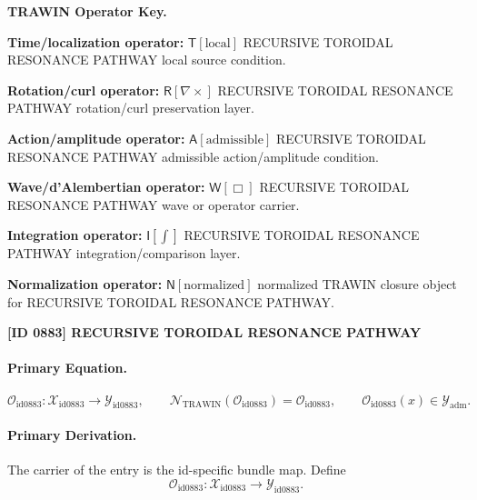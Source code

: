 \par\vspace{0.45\baselineskip}
\noindent\begin{minipage}[t]{\linewidth}
\begingroup
\small
\raggedright
\textbf{TRAWIN Operator Key.}\par
\noindent\textbf{Time/localization operator:} $\mathsf{T}\!\left[\mathrm{local}\right]$ RECURSIVE TOROIDAL RESONANCE PATHWAY local source condition.\par
\noindent\textbf{Rotation/curl operator:} $\mathsf{R}\!\left[\nabla\times\right]$ RECURSIVE TOROIDAL RESONANCE PATHWAY rotation/curl preservation layer.\par
\noindent\textbf{Action/amplitude operator:} $\mathsf{A}\!\left[\mathrm{admissible}\right]$ RECURSIVE TOROIDAL RESONANCE PATHWAY admissible action/amplitude condition.\par
\noindent\textbf{Wave/d'Alembertian operator:} $\mathsf{W}\!\left[\Box\right]$ RECURSIVE TOROIDAL RESONANCE PATHWAY wave or operator carrier.\par
\noindent\textbf{Integration operator:} $\mathsf{I}\!\left[\int\right]$ RECURSIVE TOROIDAL RESONANCE PATHWAY integration/comparison layer.\par
\noindent\textbf{Normalization operator:} $\mathsf{N}\!\left[\mathrm{normalized}\right]$ normalized TRAWIN closure object for RECURSIVE TOROIDAL RESONANCE PATHWAY.\par
\endgroup
\end{minipage}

\clearpage
\noindent\textbf{[ID 0883] RECURSIVE TOROIDAL RESONANCE PATHWAY}\par
\vspace{0.35em}
\paragraph{Primary Equation.}
\[
\mathcal{O}_{\mathrm{id0883}}:\mathcal{X}_{\mathrm{id0883}}\longrightarrow \mathcal{Y}_{\mathrm{id0883}},\qquad
\mathcal{N}_{\mathrm{TRAWIN}}(\mathcal{O}_{\mathrm{id0883}})=\mathcal{O}_{\mathrm{id0883}},\qquad
\mathcal{O}_{\mathrm{id0883}}(x)\in\mathcal{Y}_{\mathrm{adm}}.
\]

\paragraph{Primary Derivation.} The carrier of the entry is the id-specific bundle map.  Define\[
\mathcal{O}_{\mathrm{id0883}}:\mathcal{X}_{\mathrm{id0883}}\longrightarrow \mathcal{Y}_{\mathrm{id0883}}.
\]

